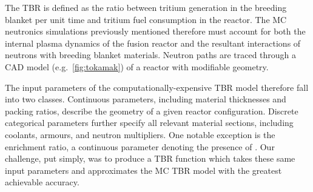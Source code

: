 The TBR is defined as the ratio between tritium generation in the breeding
blanket per unit time and tritium fuel consumption in the reactor. The MC
neutronics simulations previously mentioned therefore must account for both the
internal plasma dynamics of the fusion reactor and the resultant interactions of
neutrons with breeding blanket materials. Neutron paths are traced through a CAD
model (e.g.~\cref{fig:tokamak}) of a reactor with modifiable geometry.

The input parameters of the computationally-expensive TBR model therefore fall
into two classes. Continuous parameters, including material thicknesses and
packing ratios, describe the geometry of a given reactor configuration. Discrete
categorical parameters further specify all relevant material sections, including
coolants, armours, and neutron multipliers. One notable exception is the
enrichment ratio, a continuous parameter denoting the presence of
. Our challenge, put simply, was to produce a TBR function which
takes these same input parameters and approximates the MC TBR model with the
greatest achievable accuracy.


